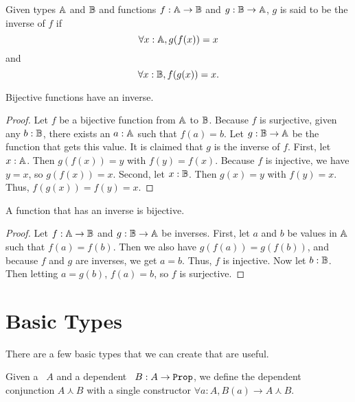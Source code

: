 \documentclass[../math.tex]{subfiles}
\begin{document}
\begin{definition}
    Given types $\mathbb{A}$ and $\mathbb{B}$ and functions $f : \mathbb{A} \rightarrow \mathbb{B}$ and $g : \mathbb{B}
    \rightarrow \mathbb{A}$, $g$ is said to be the inverse of $f$ if
    \[
        \forall x : \mathbb{A}, g(f(x)) = x
    \]
    and
    \[
        \forall x : \mathbb{B}, f(g(x)) = x.
    \]
\end{definition}

\begin{theorem} \label{bijective_inverse_ex}
    Bijective functions have an inverse.
\end{theorem}
\begin{proof}
    Let $f$ be a bijective function from $\mathbb{A}$ to $\mathbb{B}$.  Because $f$ is
    surjective, given any $b : \mathbb{B}$, there exists an $a : \mathbb{A}$ such that $f(a) =
    b$.  Let $g : \mathbb{B} \rightarrow \mathbb{A}$ be the function that gets this value.  It
    is claimed that $g$ is the inverse of $f$.  First, let $x : \mathbb{A}$.  Then
    $g(f(x)) = y$ with $f(y) = f(x)$.  Because $f$ is injective, we have $y =
    x$, so $g(f(x)) = x$.  Second, let $x : \mathbb{B}$.  Then $g(x) = y$ with $f(y) =
    x$.  Thus, $f(g(x)) = f(y) = x$.
\end{proof}

\begin{instance} \label{inverse_ex_bijective}
    A function that has an inverse is bijective.
\end{instance}
\begin{proof}
    Let $f : \mathbb{A} \rightarrow \mathbb{B}$ and $g : \mathbb{B} \rightarrow \mathbb{A}$ be inverses.  First,
    let $a$ and $b$ be values in $\mathbb{A}$ such that $f(a) = f(b)$.  Then we also
    have $g(f(a)) = g(f(b))$, and because $f$ and $g$ are inverses, we get $a =
    b$.  Thus, $f$ is injective.  Now let $b : \mathbb{B}$.  Then letting $a = g(b)$,
    $f(a) = b$, so $f$ is surjective.
\end{proof}

\section{Basic Types} \label{sec_types}

There are a few basic types that we can create that are useful.

\begin{definition}
    Given a \Prop\ $A$ and a dependent \Prop\ $B : A \rightarrow \Prop$, we
    define the dependent conjunction $A \curlywedge B$ with a single
    constructor $\forall a : A, B(a) \rightarrow A \curlywedge B$.
\end{definition}
\end{document}
